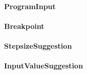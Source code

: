 \documentclass[parskip=full]{scrartcl}
\begin{document}
\paragraph{ProgramInput}
\paragraph{Breakpoint}
\paragraph{StepsizeSuggestion}
\paragraph{InputValueSuggestion}
\end{document}
